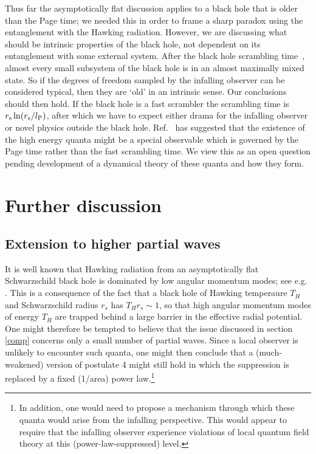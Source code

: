 \documentclass[12pt]{article}
\newcommand{\sect}[1]{\section{#1}\setcounter{equation}{0}}
\begin{document}
Thus far the {asymptotically flat} discussion applies to a black hole that is older than the Page time; we needed this in order to frame a sharp paradox using the entanglement with the Hawking radiation.  However, we are discussing what should be intrinsic properties of the black hole, not dependent on its entanglement with some external system.  After the black hole scrambling time~\cite{Hayden:2007cs,Sekino:2008he}, almost every small subsystem of the black hole
is in an almost maximally mixed state. So if the degrees of freedom sampled by the infalling observer can be considered typical, then they are `old' in an
intrinsic sense.  Our conclusions should then hold.  If the black hole is a fast scrambler the scrambling time is $r_{\rm s} \ln (r_{\rm s}/l_{\rm P})$, after which we have to expect either drama for the infalling observer or novel physics outside the black hole.   Ref.~\cite{Suss2} has suggested that the existence of the high energy quanta might be a special observable which is governed by the Page time rather than the fast scrambling time.  We view this as an open question {pending development of a dynamical theory of these quanta and how they form.}


\sect{Further discussion}

\label{disc}

\subsection{Extension to higher partial waves}


It is well known that Hawking radiation from an asymptotically flat Schwarzschild black hole is dominated by low angular momentum modes; see e.g. \cite{Page:1976df}.  This is a consequence of the fact that a black hole of  Hawking temperaure $T_H$ and Schwarzschild radius $r_s$ has $T_H  r_s \sim 1$, so that high angular momentum modes of energy $T_H$ are trapped behind a large barrier in the effective radial potential.  One might therefore be tempted to believe that the issue discussed in section \ref{comp} concerns only a small number of partial waves.  Since a local observer is unlikely to encounter such quanta, one might then conclude that a (much-weakened) version of postulate 4 might still hold in which the suppression is replaced by a fixed (1/area) power law.\footnote{In addition, one would need to propose a mechanism through which these quanta would arise from the infalling perspective.  This would appear to require that the infalling observer experience violations of local quantum field theory at this (power-law-suppressed) level.}
\end{document}
